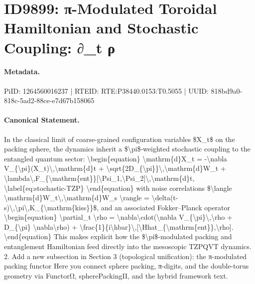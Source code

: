 \section*{ID9899: π-Modulated Toroidal Hamiltonian and Stochastic Coupling: ∂\_t ρ}
\paragraph{Metadata.}
PiID: 1264560016237 | RTEID: RTE:P38440.0153:T0.5055 | UUID: 818bd9a0-818c-5ad2-88ce-e7d67b158065

\paragraph{Canonical Statement.}
In the classical limit of coarse-grained configuration variables \$X\_t\$ on the packing sphere, the dynamics inherit a \$\textbackslash{}pi\$-weighted stochastic coupling to the entangled quantum sector: \textbackslash{}begin\{equation\} \textbackslash{}mathrm\{d\}X\_t = -\textbackslash{}nabla V\_\{\textbackslash{}pi\}(X\_t)\textbackslash{},\textbackslash{}mathrm\{d\}t + \textbackslash{}sqrt\{2D\_\{\textbackslash{}pi\}\}\textbackslash{},\textbackslash{}mathrm\{d\}W\_t + \textbackslash{}lambda\textbackslash{},F\_\{\textbackslash{}mathrm\{ent\}\}[\textbackslash{}Psi\_1,\textbackslash{}Psi\_2]\textbackslash{},\textbackslash{}mathrm\{d\}t, \textbackslash{}label\{eq:stochastic-TZP\} \textbackslash{}end\{equation\} with noise correlations \$\textbackslash{}langle \textbackslash{}mathrm\{d\}W\_t\textbackslash{},\textbackslash{}mathrm\{d\}W\_s \textbackslash{}rangle = \textbackslash{}delta(t-s)\textbackslash{},\textbackslash{}pi\textbackslash{},K\_\{\textbackslash{}mathrm\{kiss\}\}\$, and an associated Fokker--Planck operator \textbackslash{}begin\{equation\} \textbackslash{}partial\_t \textbackslash{}rho = \textbackslash{}nabla\textbackslash{}cdot(\textbackslash{}nabla V\_\{\textbackslash{}pi\}\textbackslash{},\textbackslash{}rho + D\_\{\textbackslash{}pi\} \textbackslash{}nabla\textbackslash{}rho) + \textbackslash{}frac\{1\}\{i\textbackslash{}hbar\}\textbackslash{},[\textbackslash{}Hhat\_\{\textbackslash{}mathrm\{ent\}\},\textbackslash{}rho]. \textbackslash{}end\{equation\} This makes explicit how the \$\textbackslash{}pi\$-modulated packing and entanglement Hamiltonian feed directly into the mesoscopic TZPQVT dynamics. 2. Add a new subsection in Section 3 (topological unification): the π-modulated packing functor Here you connect sphere packing, π-digits, and the double-torus geometry via FunctorΩ, spherePackingΠ, and the hybrid framework text.

